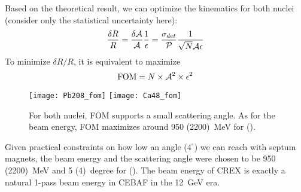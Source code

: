 Based on the theoretical result, we can optimize the kinematics for both nuclei 
(consider only the statistical uncertainty here):
\begin{equation}
    \frac{\delta R}{R} = \frac{\delta \mathcal{A}}{\mathcal{A}} \frac{1}{\epsilon} 
	= \frac{\sigma_{det}}{\mathcal{P}} \frac{1}{\sqrt{N} \mathcal{A} \epsilon}
\end{equation}
To minimize $\delta R/R$, it is equivalent to maximize 
\begin{equation}
    \text{FOM} = N\times \mathcal{A}^2 \times \epsilon^2
\end{equation}
\begin{figure}
    \texttt{[image: Pb208\_fom]}
    \texttt{[image: Ca48\_fom]}
    \caption{For both nuclei, FOM supports a small scattering angle. As for the beam energy,
    FOM maximizes around 950 (2200)~MeV for \Pb (\Ca).}
\end{figure}

Given practical constraints on how low an angle ($4^\circ$) we can reach with 
septum magnets, the beam energy and the scattering angle were chosen to be 950 (2200)~MeV
and 5 (4)~degree for \Pb (\Ca). The beam energy of CREX is exactly a natural 1-pass beam
energy in CEBAF in the 12~GeV era.
\begin{comment}
For PREX-II: average sensitivity reduced by 5\% due to ${}^{12}C$ contamination
For CREX: average sensitivity reduced by 10\% due to ${}^{40}Ca$ contamination

While a quartz Cerenkov detector is valued for radiation hardness and insensitivity to soft backgrounds, there is a particular challenge for few GeV electrons. In this energy range, shower fluctuations in a thick or radiated detector significantly degrade energy resolution, while photon statistics degrade the energy resolution for a thin detector. The energy resolution $\Delta E$ at nominal electron energy E increases the statistical error that one would have with infinite resolution $\sigma_0$ to obtain the total statistical error:
$$ \sigma = \sigma_0\sqrt{1+\left(\frac{\Delta E}{E}\right)^2}$$
    
Based on experience in the PREX experiment, we expect an reduction of statistical precision of a factor of 1.06 due to detector resolution.
\end{comment}

